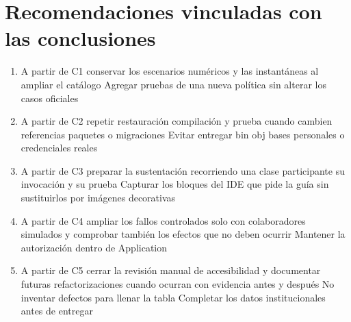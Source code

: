 
\section{Recomendaciones vinculadas con las conclusiones}
\begin{enumerate}[label=R\arabic*,leftmargin=1.2cm]
\item A partir de C1 conservar los escenarios numéricos y las instantáneas al ampliar el catálogo Agregar pruebas de una nueva política sin alterar los casos oficiales
\item A partir de C2 repetir restauración compilación y prueba cuando cambien referencias paquetes o migraciones Evitar entregar bin obj bases personales o credenciales reales
\item A partir de C3 preparar la sustentación recorriendo una clase participante su invocación y su prueba Capturar los bloques del IDE que pide la guía sin sustituirlos por imágenes decorativas
\item A partir de C4 ampliar los fallos controlados solo con colaboradores simulados y comprobar también los efectos que no deben ocurrir Mantener la autorización dentro de Application
\item A partir de C5 cerrar la revisión manual de accesibilidad y documentar futuras refactorizaciones cuando ocurran con evidencia antes y después No inventar defectos para llenar la tabla Completar los datos institucionales antes de entregar
\end{enumerate}
